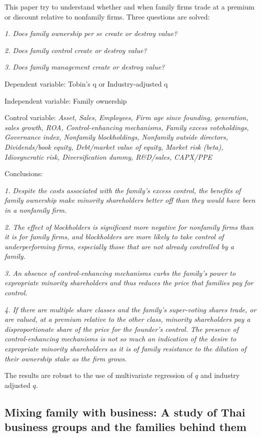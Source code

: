 \documentclass{article}
\begin{document}
    This paper try to understand whether and when family firms trade at a premium or discount relative to nonfamily firms.
    Three questions are solved: 

    \emph{1. Does family ownership per se create or destroy value?}

    \emph{2. Does family control create or destroy value?}

    \emph{3. Does family management create or destroy value?}

    Dependent variable: Tobin's q or Industry-adjusted q
    
    Independent variable: Family ownership 
    
    Control variable: \emph{Asset, Sales, Employees, Firm age since founding, generation, sales growth,
    ROA, Control-enhancing mechanisms, Family excess voteholdings, Governance index, Nonfamily blockholdings, Nonfamily outside directors, Dividends/book equity, Debt/market value of equity,
    Market risk (beta), Idiosyncratic risk, Diversification dummy, R\&D/sales, CAPX/PPE}   

    Conclusions:

    \emph{1. Despite the costs associated with the family's excess control, the benefits 
    of family ownership make minority shareholders better off than they would have been in
    a nonfamily firm.}

    \emph{2. The effect of blockholders is significant more negative for nonfamily 
    firms than it is for family firms, and blockholders are more likely to take control of 
    underperforming firms, especially those that are not already controlled by a family.}
    
    \emph{3. An absence of control-enhancing mechanisms curbs the family’s power to expropriate minority 
    shareholders and thus reduces the price that families pay for control. }

    \emph{4. If there are multiple share classes and the family’s super-voting shares trade, or are valued, 
    at a premium relative to the other class, minority shareholders pay a disproportionate share of the price for the founder’s control.
    The presence of control-enhancing mechanisms is not so much an indication of the desire to expropriate 
    minority shareholders as it is of family resistance to the dilution of their ownership stake as the firm grows.}
    

    The results are robust to the use of multivariate regression of $q$ and industry adjusted $q$. 
\subsection{Mixing family with business: A study of Thai business groups and the families behind them}
    ~\
\end{document}
